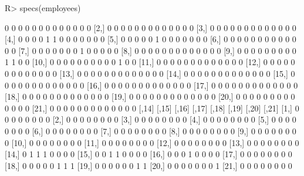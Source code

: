 \begin{Schunk}
% --begin: "lcut.specs"
\begin{Sinput}
R> specs(employees)
\end{Sinput}
\begin{Soutput}
      [,1] [,2] [,3] [,4] [,5] [,6] [,7] [,8] [,9] [,10] [,11] [,12] [,13]
 [1,]    0    0    0    0    0    0    0    0    0     0     0     0     0
 [2,]    0    0    0    0    0    0    0    0    0     0     0     0     0
 [3,]    0    0    0    0    0    0    0    0    0     0     0     0     0
 [4,]    0    0    0    0    1    1    0    0    0     0     0     0     0
 [5,]    0    0    0    0    0    1    0    0    0     0     0     0     0
 [6,]    0    0    0    0    0    0    0    0    0     0     0     0     0
 [7,]    0    0    0    0    0    0    0    1    0     0     0     0     0
 [8,]    0    0    0    0    0    0    0    0    0     0     0     0     0
 [9,]    0    0    0    0    0    0    0    0    0     1     1     0     0
[10,]    0    0    0    0    0    0    0    0    0     0     1     0     0
[11,]    0    0    0    0    0    0    0    0    0     0     0     0     0
[12,]    0    0    0    0    0    0    0    0    0     0     0     0     0
[13,]    0    0    0    0    0    0    0    0    0     0     0     0     0
[14,]    0    0    0    0    0    0    0    0    0     0     0     0     0
[15,]    0    0    0    0    0    0    0    0    0     0     0     0     0
[16,]    0    0    0    0    0    0    0    0    0     0     0     0     0
[17,]    0    0    0    0    0    0    0    0    0     0     0     0     0
[18,]    0    0    0    0    0    0    0    0    0     0     0     0     0
[19,]    0    0    0    0    0    0    0    0    0     0     0     0     0
[20,]    0    0    0    0    0    0    0    0    0     0     0     0     0
[21,]    0    0    0    0    0    0    0    0    0     0     0     0     0
      [,14] [,15] [,16] [,17] [,18] [,19] [,20] [,21]
 [1,]     0     0     0     0     0     0     0     0
 [2,]     0     0     0     0     0     0     0     0
 [3,]     0     0     0     0     0     0     0     0
 [4,]     0     0     0     0     0     0     0     0
 [5,]     0     0     0     0     0     0     0     0
 [6,]     0     0     0     0     0     0     0     0
 [7,]     0     0     0     0     0     0     0     0
 [8,]     0     0     0     0     0     0     0     0
 [9,]     0     0     0     0     0     0     0     0
[10,]     0     0     0     0     0     0     0     0
[11,]     0     0     0     0     0     0     0     0
[12,]     0     0     0     0     0     0     0     0
[13,]     0     0     0     0     0     0     0     0
[14,]     0     1     1     1     0     0     0     0
[15,]     0     0     1     1     0     0     0     0
[16,]     0     0     0     1     0     0     0     0
[17,]     0     0     0     0     0     0     0     0
[18,]     0     0     0     0     0     1     1     1
[19,]     0     0     0     0     0     0     1     1
[20,]     0     0     0     0     0     0     0     1
[21,]     0     0     0     0     0     0     0     0
\end{Soutput}
%
% --end: "lcut.specs"
\end{Schunk}
